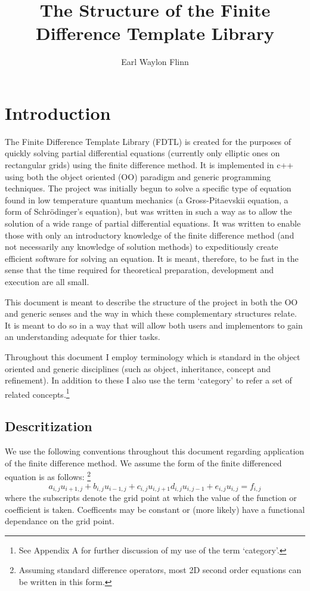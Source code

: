\documentclass{article}
\title{The Structure of the Finite Difference Template Library}
\author{Earl Waylon Flinn}
\begin{document}
\maketitle
\section{Introduction}


The Finite Difference Template Library (FDTL) is created for the purposes of
quickly solving partial differential equations (currently only elliptic ones
on rectangular grids) using the finite difference method. It is implemented 
in c++ using both the object oriented (OO) paradigm and generic programming 
techniques. The project was initially begun to solve a specific type of 
equation found in low temperature quantum mechanics (a Gross-Pitaevskii 
equation, a form of Schr\"odinger's equation), but was written in such a way
as to allow the solution of a wide range of partial differential equations. 
It was written to enable those with only an introductory knowledge of the 
finite difference method (and not necessarily any knowledge of solution 
methods) to  expeditiously create efficient software for solving an equation.
It is meant, therefore, to be fast in the sense that the time required for 
theoretical preparation, development and execution are all small.


This document is meant to describe the structure of the project in both the OO 
and generic senses and the way in which these complementary structures relate. 
It is meant to do so in a way that will allow both users and implementors to 
gain an understanding adequate for thier tasks.


Throughout this document I employ terminology which is standard in the object 
oriented and generic disciplines (such as object, inheritance, concept and 
refinement). In addition to these I also use the term `category' to refer a 
set of related concepts.\footnote{ See Appendix A for further discussion of my
use of the term `category'.}

\subsection{Descritization}

We use the following conventions throughout this document regarding application of
the finite difference method. 
We assume the form of the finite differenced equation is as follows: \footnote{Assuming
standard difference operators, most 2D second order equations can be written in this form.}
\begin{equation}
a_{i,j} u_{i+1, j} + b_{i,j} u_{i-1, j} + c_{i,j} u_{i, j+1} d_{i,j} u_{i, j-1}
+ e_{i,j} u_{i, j} = f_{i,j}
\end{equation}
where the subscripts denote the grid point at which the value of the function or coefficient is taken.
Coefficents may be constant or (more likely) have a functional dependance on the grid point.
\end{document}
